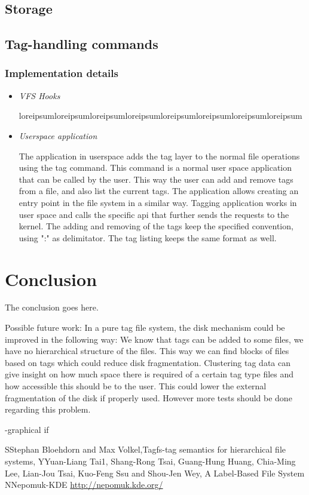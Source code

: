       
\subsection{Storage}
\subsection{Tag-handling commands}

\subsubsection{Implementation details}
\begin{itemize}
    \item{\textit{VFS Hooks}}
    
loreipsumloreipsumloreipsumloreipsumloreipsumloreipsumloreipsumloreipsum
    \item{\textit{Userspace application}}

The application in userspace adds the tag layer to the normal file operations using the tag
command. This command is a normal user space application that can be called by the user. 
This way the user can add and
remove tags from a file, and also list the current tags. The application allows creating an entry point in the file
system in a similar way. Tagging application works in user space and calls the specific api
that further sends the requests to the kernel. The adding and removing of the tags keep the 
specified convention, using ":" as delimitator. The tag listing keeps the same format as well.
\end{itemize}

\section{Conclusion}
The conclusion goes here.

Possible future work:
In a pure tag file system, the disk mechanism could be improved in the following way:
We know that tags can be added to some files, we have no hierarchical structure of the files.
This way we can find blocks of files based on tags which could reduce disk fragmentation. 
Clustering tag data can give insight on how much space there is required of a certain tag type files
and how accessible this should be to the user. This could lower the external fragmentation of the disk
if properly used. However more tests should be done regarding this problem. 

-graphical if

\begin{thebibliography}{1}
	\bibitem SStephan Bloehdorn and Max Volkel,Tagfs-tag semantics for hierarchical file systems, 
	\bibitem YYuan-Liang Tai1, Shang-Rong Tsai, Guang-Hung Huang, Chia-Ming Lee,
Lian-Jou Tsai, Kuo-Feng Ssu and Shou-Jen Wey, A Label-Based File System
    \bibitem NNepomuk-KDE \url{http://nepomuk.kde.org/}
\end{thebibliography}




